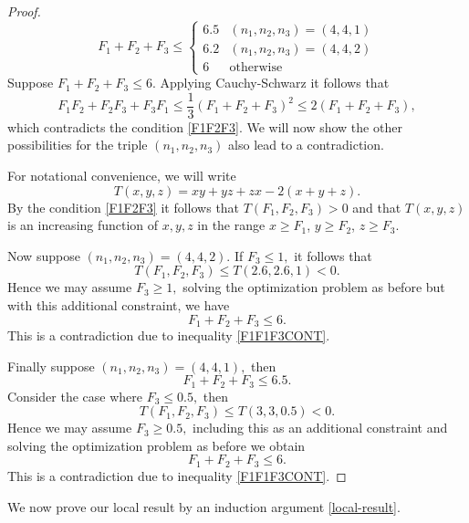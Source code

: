 \documentclass[a4paper,11pt,twoside]{amsart}
\theoremstyle{definition}
\numberwithin{equation}{section}
\begin{document}
\begin{proof}
$$F_1 + F_2 + F_3 \leq
\begin{cases}
 6.5      &     (n_1,n_2,n_3) = (4,4,1) \\
 6.2      & (n_1,n_2,n_3) = (4,4,2)\\
 6        &     \textrm{otherwise}

\end{cases}
$$
Suppose $F_1 + F_2 + F_3 \leq 6.$ Applying Cauchy-Schwarz it follows that \begin{equation} \label{F1F1F3CONT}
    F_1F_2 + F_2F_3 + F_3F_1 \leq \frac{1}{3}(F_1 + F_2 + F_3)^2 \leq 2(F_1 + F_2 + F_3),
\end{equation} which contradicts the condition \eqref{F1F2F3}. We will now show the other possibilities for the triple $(n_1,n_2,n_3)$ also lead to a contradiction. 




For notational convenience, we will write $$T(x,y,z) = xy + yz + zx - 2(x+y+z).$$ By the condition \eqref{F1F2F3} it follows that $T(F_1,F_2,F_3) > 0$ and that $T(x,y,z)$ is an increasing function of $x,y,z$ in the range $x \geq F_1$, $y \geq F_2$, $z \geq F_3$. 

Now suppose $(n_1,n_2,n_3) = (4,4,2)$. If $F_3 \leq 1,$ it follows that $$T(F_1,F_2,F_3) \leq T(2.6,2.6,1) < 0.$$ Hence we may assume $F_3 \geq 1,$ solving the optimization problem as before but with this additional constraint, we have $$F_1 + F_2 + F_3 \leq 6.$$ This is a contradiction due to inequality \eqref{F1F1F3CONT}.

Finally suppose $(n_1,n_2,n_3) = (4,4,1),$ then $$F_1 + F_2 + F_3 \leq 6.5.$$ Consider the case where $F_3 \leq 0.5,$ then $$T(F_1,F_2,F_3) \leq T(3,3,0.5) < 0.$$ Hence we may assume $F_3 \geq 0.5,$ including this as an additional constraint and solving the optimization problem as before we obtain $$F_1 + F_2 + F_3 \leq 6.$$ This is a contradiction due to inequality \eqref{F1F1F3CONT}.
\end{proof}

We now prove our local result by an induction argument \ref{local-result}. 
\end{document}
